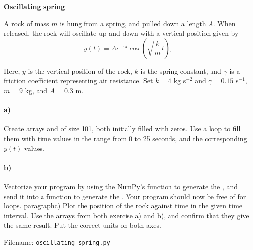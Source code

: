 \begin{Problem}{\textbf{Oscillating spring}}

\noindent A rock of mass $m$ is hung from a spring, and pulled down a length $A$. When
released, the rock will oscillate up and down with a 
vertical position given by
\[
y(t) = A e^{-\gamma t}\cos\left(\sqrt{\frac{k}{m}}t\right),
\]

Here, $y$ is the vertical position of the rock, $k$ is the spring
constant, and $\gamma$ is a friction coefficient representing
air resistance. Set $k = 4$ kg s$^{-2}$ and $\gamma = 0.15$ s$^{-1}$,
$m = 9$ kg, and $A = 0.3$ m.
\paragraph{a)} Create arrays  and 
 of size 101, both initially filled with zeros. 
Use a  loop to fill them with time values in the range from 0 to 25 seconds, and the
corresponding $y(t)$ values.
\paragraph{b)} Vectorize your program by using the NumPy's  
function to generate the , and
send it into a function  to generate the . Your program should now be free of
for loops.
paragraph{c)}
Plot the position of the rock against time in the given time interval. Use the arrays from both exercise a) and b), and confirm that they give the same result. Put the correct units on both axes. 

Filename: \texttt{oscillating\_spring.py}
\end{Problem}

